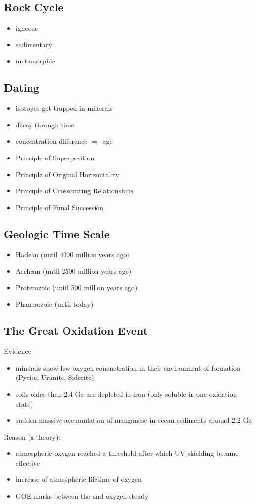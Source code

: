 \documentclass{article}
\theoremstyle{sltheorem}
\begin{document}
\subsection{Rock Cycle}
\begin{itemize}
    \item igneous
    \item sedimentary
    \item metamorphic
\end{itemize}
\subsection{Dating}
\begin{itemize}
    \item isotopes get trapped in minerals
    \item decay through time
    \item concentration difference $\Rightarrow$ age
\end{itemize}
\begin{itemize}
    \item Principle of Superposition
    \item Principle of Original Horizontality
    \item Principle of Crosscutting Relationships
    \item Principle of Funal Succession
\end{itemize}
\subsection{Geologic Time Scale}
\begin{itemize}
    \item Hadean (until 4000 million years ago)
    \item Archean (until 2500 million years ago)
    \item Proterozoic (until 500 million years ago)
    \item Phanerozoic (until today)
\end{itemize}
\subsection{The Great Oxidation Event}
Evidence:
\begin{itemize}
    \item minerals show low oxygen conenctration in their environment of formation (Pyrite, Uranite, Siderite)
    \item soils older than 2.4 Ga are depleted in iron (only soluble in one oxidation state)
    \item sudden massive accumulation of manganese in ocean sediments around 2.2 Ga
\end{itemize}
Reason (a theory):
\begin{itemize}
    \item atmospheric oxygen reached a threshold after which UV shielding became effective
    \item increase of atmospheric lifetime of oxygen
    \item GOE marks  between the  and  oxygen steady 
\end{itemize}
\end{document}
